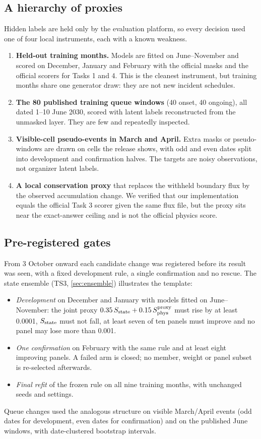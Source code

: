\subsection{A hierarchy of proxies}
Hidden labels are held only by the evaluation platform, so every decision used one of four local instruments, each
with a known weakness.
\begin{enumerate}[label=(\roman*)]
  \item \textbf{Held-out training months.} Models are fitted on June--November and scored on December, January and
        February with the official masks and the official scorers for Tasks 1 and 4. This is the cleanest instrument,
        but training months share one generator draw: they are not new incident schedules.
  \item \textbf{The 80 published training queue windows} (40 onset, 40 ongoing), all dated 1--10 June 2030, scored
        with latent labels reconstructed from the unmasked layer. They are few and repeatedly inspected.
  \item \textbf{Visible-cell pseudo-events in March and April.} Extra masks or pseudo-windows are drawn on cells the
        release shows, with odd and even dates split into development and confirmation halves. The targets are noisy
        observations, not organizer latent labels.
  \item \textbf{A local conservation proxy} that replaces the withheld boundary flux by the observed accumulation
        change. We verified that our implementation equals the official Task 3 scorer given the same flux file, but
        the proxy sits near the exact-answer ceiling and is not the official physics score.
\end{enumerate}

\subsection{Pre-registered gates}
From 3 October onward each candidate change was registered before its result was seen, with a fixed development
rule, a single confirmation and no rescue. The state ensemble (TS3, \cref{sec:ensemble}) illustrates the template:
\begin{itemize}
  \item \emph{Development} on December and January with models fitted on June--November: the joint proxy
        $0.35\,S_{\mathrm{state}} + 0.15\,S_{\mathrm{phys}}^{\mathrm{proxy}}$ must rise by at least 0.0001, $S_{\mathrm{state}}$ must not fall,
        at least seven of ten panels must improve and no panel may lose more than 0.001.
  \item \emph{One confirmation} on February with the same rule and at least eight improving panels. A failed arm is
        closed; no member, weight or panel subset is re-selected afterwards.
  \item \emph{Final refit} of the frozen rule on all nine training months, with unchanged seeds and settings.
\end{itemize}
Queue changes used the analogous structure on visible March/April events (odd dates for development, even dates
for confirmation) and on the published June windows, with date-clustered bootstrap intervals.

